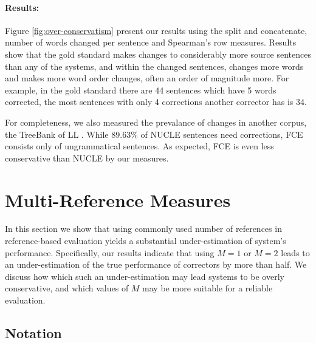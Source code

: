 \documentclass[letter,11pt]{article}
\begin{document}
\paragraph{Results:}
Figure \ref{fig:over-conservatism} present our results using the split and concatenate, number of words changed per sentence and Spearman's row measures.
Results show that the gold standard makes changes to considerably more source sentences than any of the systems, and within the changed sentences, changes more words and makes more word order changes, often an order of magnitude more. For example, in the gold standard there are 44 sentences which have 5 words corrected, the most sentences with only 4 corrections another corrector has is 34.

For completeness, we also measured the prevalance of changes in
another corpus, the TreeBank of LL \cite[FCE]{yannakoudakis2011new}.
While $89.63\%$ of NUCLE sentences need corrections, FCE consists only of ungrammatical sentences. As expected, FCE is even less conservative than NUCLE by our measures.


\section{Multi-Reference Measures}\label{sec:increase-reference}

In this section we show that using commonly used number of references in reference-based evaluation yields a substantial under-estimation of system's performance. Specifically, our results indicate that using $M=1$ or $M=2$ leads to an under-estimation of the true performance of correctors by more than half.
We discuss how which such an under-estimation may lead systems to be
overly conservative, and which values of $M$ may be more suitable for
a reliable evaluation.



\subsection{Notation}
\end{document}
